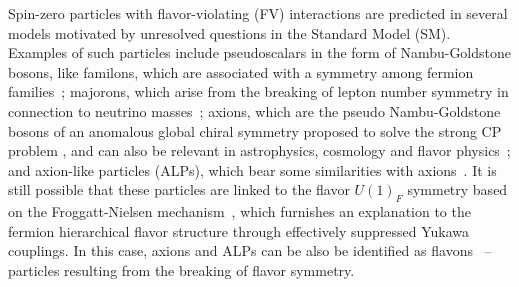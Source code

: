 \documentclass[prd,amsfonts,onecolumn,superscriptaddress,aps,nofootinbib,11pt]{revtex4-1}
\begin{document}





\setcounter{page}{1}

Spin-zero particles with flavor-violating (FV) interactions are predicted in several models motivated by unresolved questions in the Standard Model (SM). Examples of such particles include pseudoscalars in the form of Nambu-Goldstone bosons, like  familons, which are associated with a symmetry among fermion families~\cite{Wilczek:1982rv,Reiss:1982sq,Gelmini:1982zz,Feng:1997tn}; majorons, which arise from the breaking of lepton number symmetry in connection to neutrino masses~\cite{Mohapatra:1979ia,Chikashige:1980qk,Chikashige:1980ui,Gelmini:1980re}; axions, which are the pseudo Nambu-Goldstone bosons of an anomalous global chiral symmetry proposed to solve the strong CP problem \cite{Peccei:1977hh,Weinberg:1977ma,Wilczek:1977pj,Georgi:1986df}, and can also be relevant in astrophysics, cosmology and flavor physics~\cite{DiLuzio:2020wdo,Ema:2016ops,Bjorkeroth:2018dzu}; and axion-like particles (ALPs), which bear some similarities with axions~\cite{Jaeckel:2010ni,Ringwald:2012cu,Dias:2014osa,Bauer:2021mvw,Jho:2022snj}. It is still possible that these particles are linked to the flavor $U(1)_F$ symmetry based on the Froggatt-Nielsen mechanism~\cite{Froggatt:1978nt}, which furnishes an explanation to the fermion hierarchical flavor structure through effectively suppressed Yukawa couplings. In this case, axions and ALPs can be also be identified as flavons~\cite{Ema:2016ops,Bjorkeroth:2018dzu} -- particles resulting from the breaking of flavor symmetry. 
\end{document}
